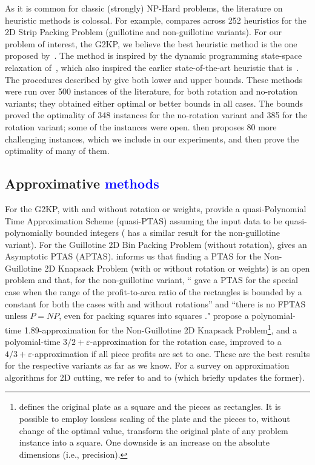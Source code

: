 \documentclass[ppgc,tese,english,formais,babel]{iiufrgs}
\newif\iffinalversion
\newcommand{\newtext}[1]{\iffinalversion%
#1%
\else%
\textcolor{blue}{#1}%
\fi%
}
\begin{document}
As it is common for classic (strongly) NP-Hard problems, the literature on heuristic methods is colossal.
For example, \citet{ortmann:2010} compares across 252 heuristics for the 2D Strip Packing Problem (guillotine and non-guillotine variants).
For our problem of interest, the G2KP, we believe the best heuristic method is the one proposed by~\citet{velasco:2019}.
The method is inspired by the dynamic programming state-space relaxation of~\citet{nicos:1995:ssr}, which also inspired the earlier state-of-the-art heuristic that is~\citet{morabito:2010}.
The procedures described by \citet{velasco:2019} give both lower and upper bounds.
These methods were run over 500 instances of the literature, for both rotation and no-rotation variants; they obtained either optimal or better bounds in all cases.
The bounds proved the optimality of 348 instances for the no-rotation variant and 385 for the rotation variant; some of the instances were open.
\citet{velasco:2019} then proposes 80 more challenging instances, which we include in our experiments, and then prove the optimality of many of them.

\subsection{Approximative \newtext{methods}}

For the G2KP, with and without rotation or weights, \citet{abed:2015} provide a quasi-Polynomial Time Approximation Scheme (quasi-PTAS) assuming the input data to be quasi-polynomially bounded integers (\citet{anna:2015:quasi} has a similar result for the non-guillotine variant).
For the Guillotine 2D Bin Packing Problem (without rotation), \citet{bansal:2005} gives an Asymptotic PTAS (APTAS).
\citet{christensen:2017} informs us that finding a PTAS for the Non-Guillotine 2D Knapsack Problem (with or without rotation or weights) is an open problem and that, for the non-guillotine variant, ``\citet{bansal:2009} gave a PTAS for the special case when the range of the profit-to-area ratio of the rectangles is bounded by a constant for both the cases with and without rotations'' and ``there is no FPTAS unless \(P = NP\), even for packing squares into squares \citep{leung:1990}."
\citet{galvez:2017} propose a polynomial-time 1.89-approximation for the Non-Guillotine 2D Knapsack Problem\footnote{\citet{galvez:2017} defines the original plate as a square and the pieces as rectangles. It is possible to employ lossless scaling of the plate and the pieces to, without change of the optimal value, transform the original plate of any problem instance into a square. One downside is an increase on the absolute dimensions (i.e., precision).}, and a polyomial-time \(3/2 + \varepsilon\)-approximation for the rotation case, improved to a \(4/3 + \varepsilon\)-approximation if all piece profits are set to one.
These are the best results for the respective variants as far as we know.
For a survey on approximation algorithms for 2D cutting, we refer to \citet{christensen:2017} and to \citet{iori:2020} (which briefly updates the former).
\end{document}
